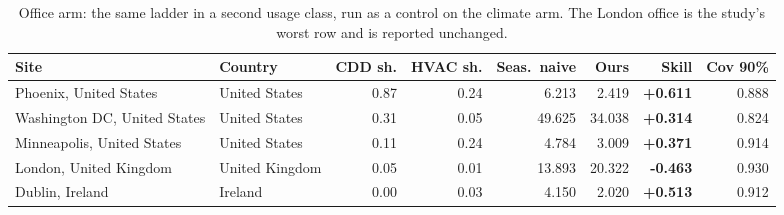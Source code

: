 \begin{table}[t]
\centering
\footnotesize
\setlength{\tabcolsep}{3.5pt}
\begin{tabular}{llrrrrrr}
\toprule
Site & Country & CDD sh. & HVAC sh. & Seas.\ naive & Ours & Skill & Cov 90\% \\
\midrule
Phoenix, United States & United States & 0.87 & 0.24 & 6.213 & 2.419 & \textbf{+0.611} & 0.888 \\
Washington DC, United States & United States & 0.31 & 0.05 & 49.625 & 34.038 & \textbf{+0.314} & 0.824 \\
Minneapolis, United States & United States & 0.11 & 0.24 & 4.784 & 3.009 & \textbf{+0.371} & 0.914 \\
London, United Kingdom & United Kingdom & 0.05 & 0.01 & 13.893 & 20.322 & \textbf{-0.463} & 0.930 \\
Dublin, Ireland & Ireland & 0.00 & 0.03 & 4.150 & 2.020 & \textbf{+0.513} & 0.912 \\
\bottomrule
\end{tabular}
\caption{Office arm: the same ladder in a second usage class, run as a control on the climate arm. The London office is the study's worst row and is reported unchanged.}
\label{tab:office}
\end{table}
